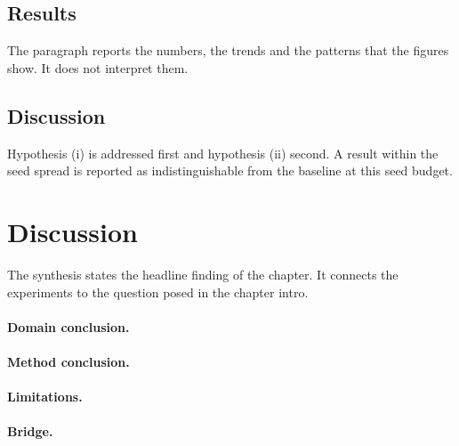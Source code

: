 \subsection{Results}
\label{sec:ch2-experiment-1-results}


 The paragraph reports the
numbers, the trends and the patterns that the figures show. It does not interpret them.

\subsection{Discussion}
\label{sec:ch2-experiment-1-discussion}


 Hypothesis (i)
is addressed first and hypothesis (ii) second. A result within the seed spread is
reported as indistinguishable from the baseline at this seed budget.

\section{Discussion}
\label{sec:ch2-discussion}

 The synthesis states the
headline finding of the chapter. It connects the experiments to the question posed in the
chapter intro.

\paragraph{Domain conclusion.} 

\paragraph{Method conclusion.} 

\paragraph{Limitations.} 

\paragraph{Bridge.} 
